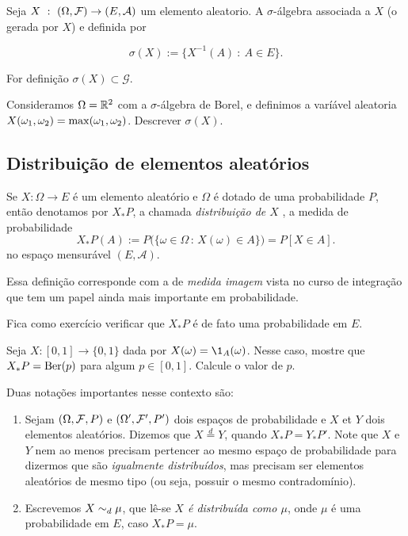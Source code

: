 \documentclass[../main/Notas_de_aula.tex]{subfiles}
\begin{document}
\begin{definition}
Seja $X \ : \ (\Omega,{\mathcal F})\to (E,{\mathcal A})$ um elemento aleatorio.
A $\sigma$-álgebra associada a $X$ (o gerada por $X$) e definida por

$$\sigma(X):=\{ X^{-1}(A) \ : \ A\in E \}.$$

For definição $\sigma(X)\subset \mathcal G$.
 \end{definition}


 \begin{exercise}
Consideramos $\Omega={\mathbb R}^2$ com a $\sigma$-álgebra de Borel, e definimos a varíável aleatoria $X(\omega_1,\omega_2)=\max(\omega_1,\omega_2)$.
Descrever $\sigma(X)$.
\end{exercise}


\subsection{Distribuição de elementos aleatórios}

\begin{definition}
  Se $X:\Omega \to E$ é um elemento aleatório e $\Omega$ é dotado de uma probabilidade $P$, então denotamos por $X_{*}P$,
  a chamada \emph{distribuição de $X$} , a medida de probabilidade
  \begin{equation}
    X_* P(A) := P\big( \{\omega \in \Omega \, : \,  X(\omega) \in A\} \big) = P[X \in A].
  \end{equation}
  no espaço mensurável $(E,\mathcal{A})$.
\end{definition}

\begin{remark}
 Essa definição corresponde com a de \textit{medida imagem} vista no curso de integração que tem um papel ainda mais importante em probabilidade.
 \end{remark}



Fica como exercício verificar que $X_*P$ é de fato uma probabilidade em $E$.

\begin{exercise}
  Seja $X:[0,1] \to \{0,1\}$ dada por $X(\omega) = \1_A (\omega)$.
  Nesse caso, mostre que $X_*P = \operatorname{Ber}(p)$ para algum $p \in [0,1]$.
  Calcule o valor de $p$.
\end{exercise}

Duas notações importantes nesse contexto são:
\begin{enumerate}[\quad a)]
\item Sejam $(\Omega, {\mathcal F}, P)$ e $(\Omega',{\mathcal F}',P')$ dois espaços de probabilidade e $X$ et $Y$ dois elementos aleatórios.
Dizemos que $X \stackrel{d}{=} Y$,  quando $X_*P = Y_*P'$.
Note que $X$ e $Y$ nem ao menos precisam pertencer ao mesmo espaço de probabilidade para dizermos que são \emph{igualmente distribuídos}, mas precisam ser elementos aleatórios de mesmo tipo (ou seja, possuir o mesmo contradomínio).
\item Escrevemos $X \sim_d \mu$,  que lê-se \emph{$X$ é distribuída como $\mu$}, onde $\mu$ é uma probabilidade em $E$, caso $X_*P = \mu$.
\end{enumerate}
\end{document}
